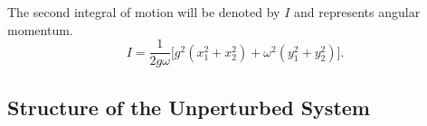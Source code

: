 

The second integral of motion will be denoted by $I$ and represents
angular momentum.
\begin{equation}
I= \frac{1}{2 g \omega}\bigl[g^2(x_1^2+x_2^2)+\omega^2(y_1^2+y_2^2)\bigr].
\end{equation}

\subsection{Structure of the Unperturbed System}
\label{s:unperturbed structure}

